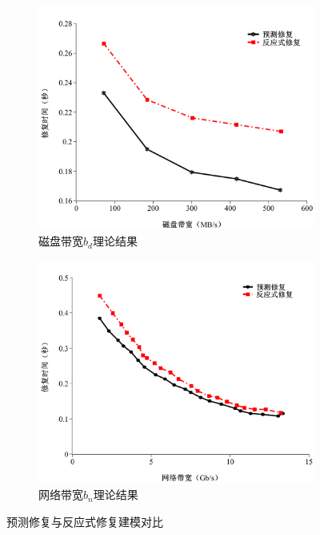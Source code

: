 \begin{figure}[htbp]
	\begin{subfigure}[t]{0.4\textwidth}
		\centering
		\includegraphics[width=1.1\linewidth]{figures/3-3.pdf}
		\caption{磁盘带宽$b_d$理论结果}
		\label{fig:3-3}
	\end{subfigure}
	\begin{subfigure}[t]{0.4\textwidth}
		\centering
		\includegraphics[width=1.1\linewidth]{figures/3-4.pdf}
		\caption{网络带宽$b_n$理论结果}
		\label{fig:3-4}
	\end{subfigure}
	\caption{预测修复与反应式修复建模对比}
	\label{fig:3.1}
\end{figure}


